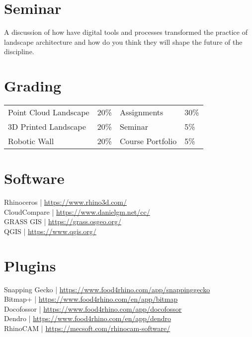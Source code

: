 \documentclass[11pt,article,oneside]{memoir}
\begin{document}
\section{Seminar}

A discussion of 
how have digital tools and processes transformed 
the practice of landscape architecture
and how do you think they will shape 
the future of the discipline.

\nocite{*} \printbibliography[keyword=seminar, heading=none]


\section{Grading}
%
\begin{table}[H]
\begin{tabular}{l r @{\hskip 2cm} l @{\hskip 0.5cm} l}
Point Cloud Landscape & 20\% &  Assignments & 30\% \\
3D Printed Landscape & 20\% & Seminar & 5\%\\
Robotic Wall & 20\% & Course Portfolio & 5\% \\
\end{tabular}
\end{table}

\section{Software}

Rhinoceros | \url{https://www.rhino3d.com/}\\
CloudCompare | \url{https://www.danielgm.net/cc/}\\
GRASS GIS | \url{https://grass.osgeo.org/}\\
QGIS | \url{https://www.qgis.org/}\\

\section{Plugins}
Snapping Gecko | \url{https://www.food4rhino.com/app/snappinggecko}\\
Bitmap+ | \url{https://www.food4rhino.com/en/app/bitmap}\\
Docofossor | \url{https://www.food4rhino.com/app/docofossor}\\
Dendro | \url{https://www.food4rhino.com/en/app/dendro}\\
RhinoCAM | \url{https://mecsoft.com/rhinocam-software/}\\
\end{document}
